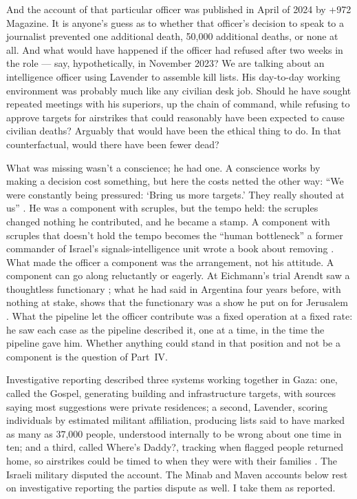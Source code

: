 And the account of that particular officer was published in April of 2024 by +972 Magazine. It is anyone's guess as to whether that officer's decision to speak to a journalist prevented one additional death, 50,000 additional deaths, or none at all. And what would have happened if the officer had refused after two weeks in the role — say, hypothetically, in November 2023? We are talking about an intelligence officer using Lavender to assemble kill lists. His day-to-day working environment was probably much like any civilian desk job. Should he have sought repeated meetings with his superiors, up the chain of command, while refusing to approve targets for airstrikes that could reasonably have been expected to cause civilian deaths? Arguably that would have been the ethical thing to do. In that counterfactual, would there have been fewer dead?

What was missing wasn't a conscience; he had one. A conscience works by making a decision cost something, but here the costs netted the other way: “We were constantly being pressured: ‘Bring us more targets.’ They really shouted at us” \autocite{abraham2024lavender}. He was a component with scruples, but the tempo held: the scruples changed nothing he contributed, and he became a stamp. A component with scruples that doesn't hold the tempo becomes the “human bottleneck” a former commander of Israel's signals-intelligence unit wrote a book about removing \autocite{ys2021humanmachine,davies2024sariel}. What made the officer a component was the arrangement, not his attitude. A component can go along reluctantly or eagerly. At Eichmann's trial Arendt saw a thoughtless functionary \autocite{arendt1963eichmann}; what he had said in Argentina four years before, with nothing at stake, shows that the functionary was a show he put on for Jerusalem \autocite{stangneth2014eichmann}. What the pipeline let the officer contribute was a fixed operation at a fixed rate: he saw each case as the pipeline described it, one at a time, in the time the pipeline gave him. Whether anything could stand in that position and not be a component is the question of Part~IV.

Investigative reporting described three systems working together in Gaza: one, called the Gospel, generating building and infrastructure targets, with sources saying most suggestions were private residences; a second, Lavender, scoring individuals by estimated militant affiliation, producing lists said to have marked as many as 37,000 people, understood internally to be wrong about one time in ten; and a third, called Where’s Daddy?, tracking when flagged people returned home, so airstrikes could be timed to when they were with their families \autocite{abraham2024lavender}. The Israeli military disputed the account. The Minab and Maven accounts below rest on investigative reporting the parties dispute as well. I take them as reported.

